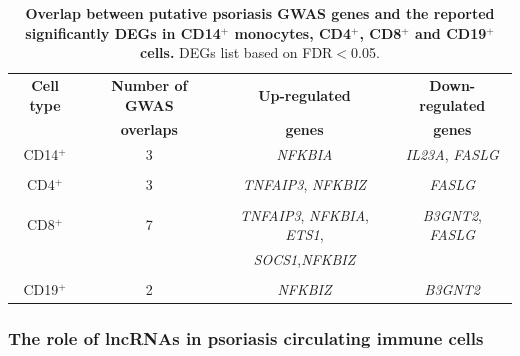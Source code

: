 \begin{table}[h]
\renewcommand{\arraystretch}{0.8}
\centering
\begin{tabular}{@{} c c c c}
\toprule
\textbf{Cell type}   & \textbf{Number of GWAS}   & \textbf{Up-regulated}   & \textbf{Down-regulated}  \\
										 & \textbf{overlaps}         & \textbf{genes}          &\textbf{genes} \\
\midrule
\midrule
CD14$^+$             & 3  & \textit{NFKBIA}                                   & \textit{IL23A}, \textit{FASLG}\\ 
                     &    &                                                   &                                \\                  
CD4$^+$              & 3  & \textit{TNFAIP3}, \textit{NFKBIZ}                 & \textit{FASLG} \\
                     &    &                                                   &                                \\  
CD8$^+$              & 7  & \textit{TNFAIP3}, \textit{NFKBIA}, \textit{ETS1}, & \textit{B3GNT2}, \textit{FASLG} \\ 
                     &    & \textit{SOCS1},\textit{NFKBIZ}                    &  \\ 
										 &    &                                                   &                                \\  
CD19$^+$             & 2  & \textit{NFKBIZ}                                   & \textit{B3GNT2}\\
\bottomrule 
\end{tabular}
\medskip %
\caption[Overlap between putative psoriasis GWAS genes and the reported significantly DEGs in CD14$^+$ monocytes, CD4$^+$, CD8$^+$ and CD19$^+$ cells.]{\textbf{Overlap between putative psoriasis GWAS genes and the reported significantly DEGs in CD14$^+$ monocytes, CD4$^+$, CD8$^+$ and CD19$^+$ cells.} DEGs list based on FDR$<$0.05.}
\label{tab:RNAseq_PS_CTL_GWAS_overlap}
\end{table}
\bigskip %


\subsubsection{The role of lncRNAs in psoriasis circulating immune cells}


